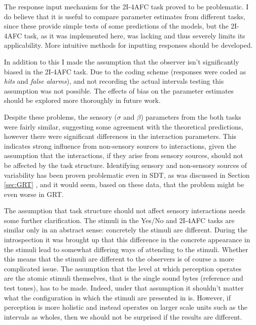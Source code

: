\documentclass{article}\usepackage{knitr}
\begin{document}
The response input mechanism for the 2I-4AFC task proved to be problematic. I do believe that it is useful to compare parameter estimates from different tasks, since these provide  simple tests of  some predictions of the models, but the 2I-4AFC task, as it was implemented  here, was lacking and thus severely limits its applicability. More intuitive methods for inputting responses should be developed. 

In addition to this I made the assumption that the observer isn't significantly biased in the 2I-4AFC task. Due to the coding scheme (responses were coded as \textit{hits} and \textit{false alarms}), and not recording the actual intervals testing this assumption was not possible. The effects of bias on the parameter estimates should be explored more thoroughly in future work.

Despite these problems, the sensory ($\sigma$ and $\beta$) parameters from the both tasks were fairly similar, suggesting some agreement with the theoretical predictions, however there were significant differences in the interaction parameters. This indicates strong influence from non-sensory sources to interactions, given the assumption that the interactions, if they arise from sensory sources, should not be affected by the task structure. Identifying sensory and non-sensory sources of variability has been proven problematic even in SDT, as was discussed in Section \ref{sec:GRT} \textit{}, and it would seem, based on these data, that the problem might be even worse in GRT. 

The assumption that task structure should not affect sensory interactions needs some further clarification. The stimuli in the Yes/No and 2I-4AFC tasks are similar only in an abstract sense: concretely the stimuli are different. During the introspection it was brought up that this difference in the concrete appearance in the stimuli lead to somewhat differing ways of attending to the stimuli. Whether this means that the stimuli are different to the observers is of course a more complicated issue. The assumption that the level at which perception operates are the atomic stimuli themselves, that is the single sound bytes (reference and test tones), has to be made. Indeed, under that assumption it shouldn't matter what the configuration in which the stimuli are presented in is. However, if perception is more holistic and instead operates on larger scale units such as the intervals as wholes, then we should not be surprised if the results are different. 
\end{document}
